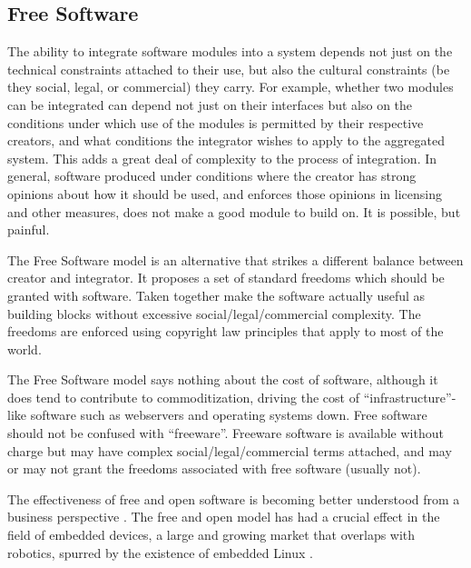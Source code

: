 \subsection{Free Software}

The ability to integrate software modules into a system
depends not just on the technical constraints attached
to their use, but also the cultural constraints
(be they social, legal, or commercial) they carry.
%
For example, whether two modules can be integrated
can depend not just on their interfaces but also on
the conditions under which use of the modules
is permitted by their respective creators,
and what conditions the integrator wishes to 
apply to the aggregated system.  
%
This adds a great deal of complexity to the process
of integration.
%
In general, software produced under conditions where the 
creator has strong opinions about how it should be 
used, and enforces those opinions in licensing
and other measures, does not make a good module 
to build on.
%
It is possible, but painful.

The Free Software model is an alternative that strikes a different
balance between creator and integrator.  It proposes a set of standard
freedoms which should be granted with software. Taken together make
the software actually useful as building blocks without excessive
social/legal/commercial complexity.  The freedoms are enforced using
copyright law principles that apply to most of the world.

The Free Software model says nothing about the cost of software,
although it does tend to contribute to commoditization, driving the
cost of ``infrastructure''-like software such as webservers and
operating systems down.  Free software should not be confused with
``freeware''.  Freeware software is available without charge but may
have complex social/legal/commercial terms attached, and may
or may not grant the freedoms associated with free software
(usually not).

The effectiveness of free and open software is 
becoming better understood from a business
perspective \cite{vonkrogh2006promise}.
%
The free and open model has had a crucial 
effect in the field of embedded devices,
a large and growing market that overlaps
with robotics, spurred by the existence
of embedded Linux \cite{henkel2006selective}.




